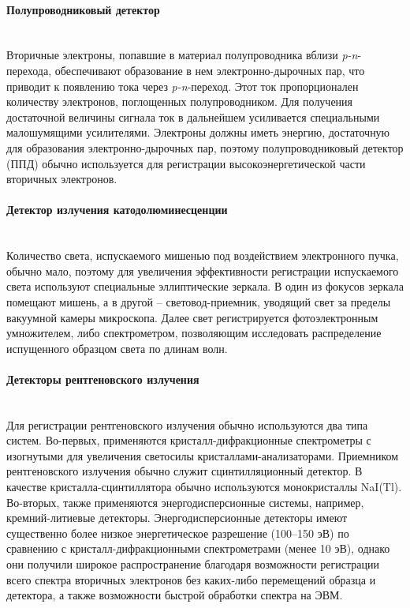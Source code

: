 \paragraph{Полупроводниковый детектор} \mbox{} \\
\indent Вторичные электроны, попавшие в материал полупроводника вблизи \textit{p-n}-перехода, обеспечивают образование в нем электронно-дырочных пар, что приводит к появлению тока через \textit{p-n}-переход. Этот ток пропорционален количеству электронов, поглощенных полупроводником. Для получения достаточной величины сигнала ток в дальнейшем усиливается специальными малошумящими усилителями. Электроны должны иметь энергию, достаточную для образования электронно-дырочных пар, поэтому полупроводниковый детектор (ППД) обычно используется для регистрации высокоэнергетической части вторичных электронов.

\paragraph{Детектор излучения катодолюминесценции} \mbox{} \\
\indent Количество света, испускаемого мишенью под воздействием электронного пучка, обычно мало, поэтому для увеличения эффективности регистрации испускаемого света используют специальные эллиптические зеркала. В один из фокусов зеркала помещают мишень, а в другой -- световод-приемник, уводящий свет за пределы вакуумной камеры микроскопа. Далее свет регистрируется фотоэлектронным умножителем, либо спектрометром, позволяющим исследовать распределение испущенного образцом света по длинам волн.

\paragraph{Детекторы рентгеновского излучения} \mbox{} \\
\indent Для регистрации рентгеновского излучения обычно используются два типа систем. Во-первых, применяются кристалл-дифракционные спектрометры с изогнутыми для увеличения светосилы кристаллами-анализаторами. Приемником рентгеновского излучения обычно служит сцинтилляционный детектор. В качестве кристалла-сцинтиллятора обычно используются монокристаллы NaI(Tl). Во-вторых, также применяются энергодисперсионные системы, например, кремний-литиевые детекторы. Энергодисперсионные детекторы имеют существенно более низкое энергетическое разрешение (100--150 эВ) по сравнению с кристалл-дифракционными спектрометрами (менее 10 эВ), однако они получили широкое распространение благодаря возможности регистрации всего спектра вторичных электронов без каких-либо перемещений образца и детектора, а также возможности быстрой обработки спектра на ЭВМ.


